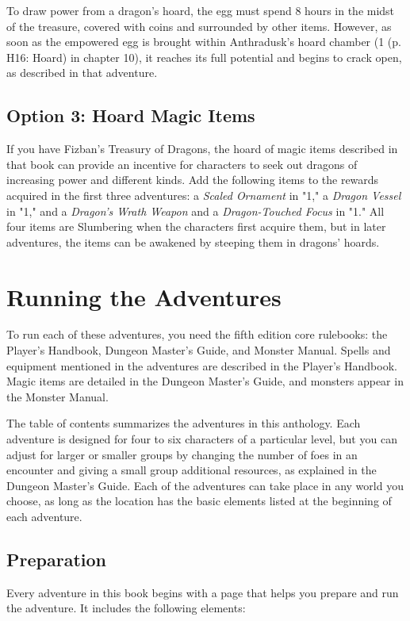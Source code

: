 \documentclass[letterpaper, 11pt, twocolumn]{dndbook}
\begin{document}
To draw power from a dragon's hoard, the egg must spend 8 hours in the midst of the treasure, covered with coins and surrounded by other items. However, as soon as the empowered egg is brought within Anthradusk's hoard chamber (1 (p. H16: Hoard) in chapter 10), it reaches its full potential and begins to crack open, as described in that adventure.

\subsection{Option 3: Hoard Magic Items}

If you have Fizban's Treasury of Dragons, the hoard of magic items described in that book can provide an incentive for characters to seek out dragons of increasing power and different kinds. Add the following items to the rewards acquired in the first three adventures: a \textit{Scaled Ornament} in "1," a \textit{Dragon Vessel} in "1," and a \textit{Dragon's Wrath Weapon} and a \textit{Dragon-Touched Focus} in "1." All four items are Slumbering when the characters first acquire them, but in later adventures, the items can be awakened by steeping them in dragons' hoards.
\section{Running the Adventures}

To run each of these adventures, you need the fifth edition core rulebooks: the Player's Handbook, Dungeon Master's Guide, and Monster Manual. Spells and equipment mentioned in the adventures are described in the Player's Handbook. Magic items are detailed in the Dungeon Master's Guide, and monsters appear in the Monster Manual.

The table of contents summarizes the adventures in this anthology. Each adventure is designed for four to six characters of a particular level, but you can adjust for larger or smaller groups by changing the number of foes in an encounter and giving a small group additional resources, as explained in the Dungeon Master's Guide. Each of the adventures can take place in any world you choose, as long as the location has the basic elements listed at the beginning of each adventure.

\subsection{Preparation}

Every adventure in this book begins with a page that helps you prepare and run the adventure. It includes the following elements:
\end{document}
